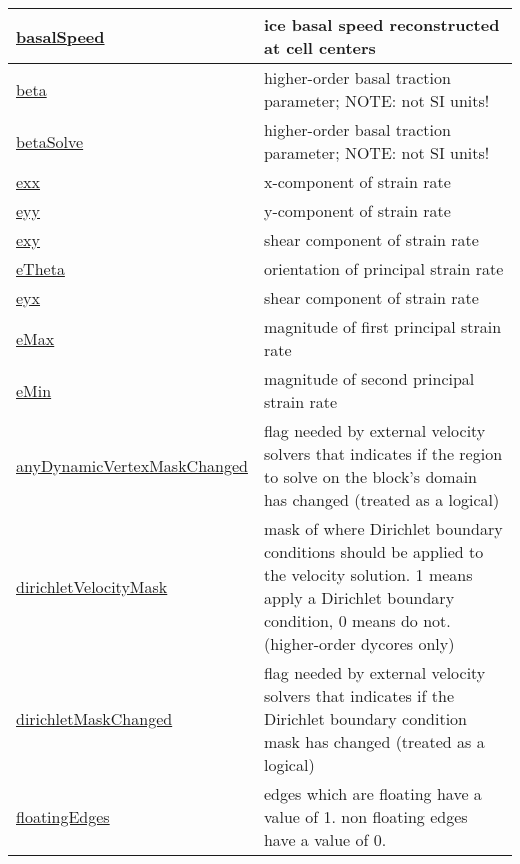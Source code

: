 {\begin{center}
\begin{longtable}{| p{2.0in} | p{4.0in} |}
    \hline
    \hyperref[subsec:var_sec_velocity_basalSpeed]{basalSpeed} & ice basal speed reconstructed at cell centers \\
    \hline
    \hyperref[subsec:var_sec_velocity_beta]{beta} & higher-order basal traction parameter; NOTE: not SI units! \\
    \hline
    \hyperref[subsec:var_sec_velocity_betaSolve]{betaSolve} & higher-order basal traction parameter; NOTE: not SI units! \\
    \hline
    \hyperref[subsec:var_sec_velocity_exx]{exx} & x-component of strain rate \\
    \hline
    \hyperref[subsec:var_sec_velocity_eyy]{eyy} & y-component of strain rate \\
    \hline
    \hyperref[subsec:var_sec_velocity_exy]{exy} & shear component of strain rate \\
    \hline
    \hyperref[subsec:var_sec_velocity_eTheta]{eTheta} & orientation of principal strain rate \\
    \hline
    \hyperref[subsec:var_sec_velocity_eyx]{eyx} & shear component of strain rate \\
    \hline
    \hyperref[subsec:var_sec_velocity_eMax]{eMax} & magnitude of first principal strain rate \\
    \hline
    \hyperref[subsec:var_sec_velocity_eMin]{eMin} & magnitude of second principal strain rate \\
    \hline
    \hyperref[subsec:var_sec_velocity_anyDynamicVertexMaskChanged]{anyDynamicVertexMaskChanged} & flag needed by external velocity solvers that indicates if the region to solve on the block's domain has changed (treated as a logical) \\
    \hline
    \hyperref[subsec:var_sec_velocity_dirichletVelocityMask]{dirichletVelocityMask} & mask of where Dirichlet boundary conditions should be applied to the velocity solution.  1 means apply a Dirichlet boundary condition, 0 means do not. (higher-order dycores only) \\
    \hline
    \hyperref[subsec:var_sec_velocity_dirichletMaskChanged]{dirichletMaskChanged} & flag needed by external velocity solvers that indicates if the Dirichlet boundary condition mask has changed (treated as a logical) \\
    \hline
    \hyperref[subsec:var_sec_velocity_floatingEdges]{floatingEdges} & edges which are floating have a value of 1.  non floating edges have a value of 0. \\
    \hline
\end{longtable}
\end{center}
}
